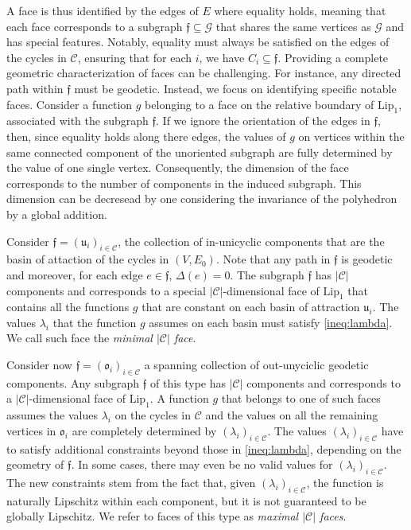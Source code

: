 \documentclass[reqno]{amsart}
\theoremstyle{plain}
\theoremstyle{definition}
\theoremstyle{remark}
\numberwithin{equation}{section}
\numberwithin{theorem}{section}
\newcommand{\<}{\langle}
\renewcommand{\>}{\rangle}
\begin{document}
\smallskip 

A face is thus identified by the edges of $E$ where equality holds, meaning that each face corresponds to a subgraph $\mathfrak f\subseteq \mathcal G$ that shares the same vertices as $\mathcal G$ and has special features. Notably, equality must always be satisfied on the edges of the cycles in $\mathcal C$, ensuring that for each $i$, we have $C_i\subseteq \mathfrak f$. Providing a complete geometric characterization of faces can be challenging. For instance, any directed path within $\mathfrak f$ must be geodetic.  Instead, we focus on identifying specific notable faces.  Consider a function $g$ belonging to a face on the relative boundary of $\mathrm{Lip}_1$, associated with the subgraph $\mathfrak f$. If we ignore the orientation of the edges in $\mathfrak f$, then,  since equality holds along there edges, the values of $g$ on vertices within the same connected component of the unoriented subgraph are fully determined by the value of one single vertex. Consequently, the dimension of the face corresponds to the number of components in the induced subgraph. 
This dimension can be decresead by one considering the invariance of the polyhedron by a global addition.

Consider $\mathfrak f=(\mathfrak u_i)_{i\in \mathcal C}$, the collection of in-unicyclic components that are
the basin of attaction of the cycles in $(V,E_0)$. Note that any path in $\mathfrak f$ is geodetic and moreover, for each edge $e\in \mathfrak f$, $\Delta(e)=0$. The subgraph $\mathfrak f$ has $|\mathcal C|$ components and corresponds to a special $|\mathcal C|$-dimensional face of $\mathrm{Lip}_1$ that contains all the functions $g$ that are constant on each basin of attraction $\mathfrak u_i$. The values $\lambda_i$ that the function $g$ assumes on each basin must satisfy \eqref{ineq:lambda}. We call such face the \emph{minimal $|\mathcal C|$ face}.

Consider now $\mathfrak f=(\mathfrak o_i)_{i\in \mathcal C}$ a spanning collection of out-unyciclic geodetic components. Any subgraph $\mathfrak f$ of this type has $|\mathcal C|$ components and corresponds to a $|\mathcal C|$-dimensional face of $\mathrm{Lip}_1$. A function $g$ that belongs to one of such faces assumes the values $\lambda_i$ on the cycles in $\mathcal C$ and the values on all the remaining
vertices in $\mathfrak o_i$ are completely determined by $(\lambda_i)_{i\in\mathcal C}$. The values $(\lambda_i)_{i\in\mathcal C}$ have to satisfy additional constraints  beyond those in  \eqref{ineq:lambda}, depending on the geometry of $\mathfrak f$. In some cases, there may even be  no valid values for $(\lambda_i)_{i\in\mathcal C}$. The new constraints stem from the fact that, given $(\lambda_i)_{i\in\mathcal C}$, the function is naturally Lipschitz within each component, but it is not guaranteed to be globally Lipschitz. We refer to faces of this type as \emph{maximal $|\mathcal C|$ faces}.
\end{document}

